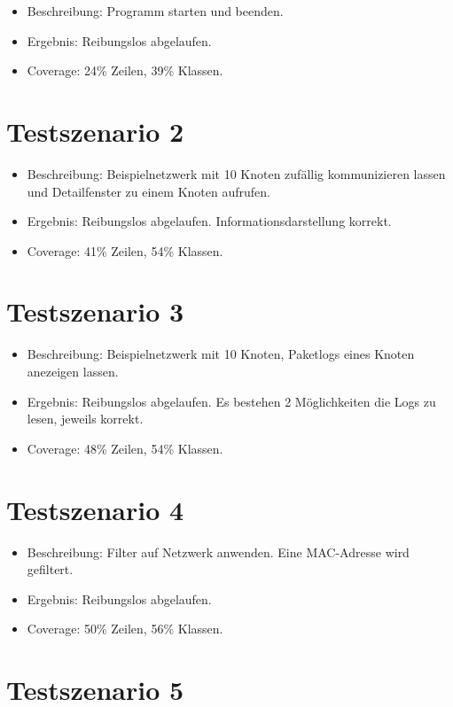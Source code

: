 \begin{itemize}
  \item Beschreibung: Programm starten und beenden.
  \item Ergebnis: Reibungslos abgelaufen.
  \item Coverage: 24\% Zeilen, 39\% Klassen.
\end{itemize}

\section{Testszenario 2}

\begin{itemize}
  \item Beschreibung: Beispielnetzwerk mit 10 Knoten zufällig kommunizieren lassen und Detailfenster zu einem Knoten aufrufen.
  \item Ergebnis: Reibungslos abgelaufen. Informationsdarstellung korrekt.
  \item Coverage: 41\% Zeilen, 54\% Klassen.
\end{itemize}

\section{Testszenario 3}

\begin{itemize}
  \item Beschreibung: Beispielnetzwerk mit 10 Knoten, Paketlogs eines Knoten anezeigen lassen.
  \item Ergebnis: Reibungslos abgelaufen. Es bestehen 2 Möglichkeiten die Logs zu lesen, jeweils korrekt.
  \item Coverage: 48\% Zeilen, 54\% Klassen.
\end{itemize}

\section{Testszenario 4}

\begin{itemize}
  \item Beschreibung: Filter auf Netzwerk anwenden. Eine MAC-Adresse wird gefiltert.
  \item Ergebnis: Reibungslos abgelaufen.
  \item Coverage: 50\% Zeilen, 56\% Klassen.
\end{itemize}

\section{Testszenario 5}


